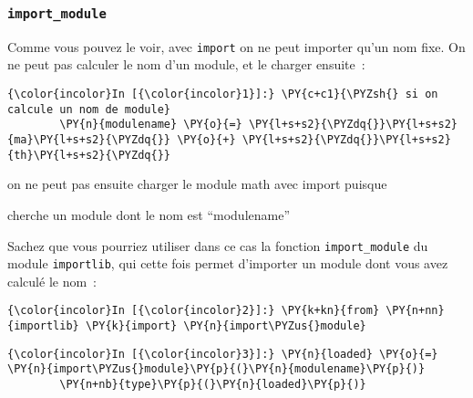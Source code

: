     \hypertarget{import_module}{%
\subsubsection{\texorpdfstring{\texttt{import\_module}}{import\_module}}\label{import_module}}

    Comme vous pouvez le voir, avec \texttt{import} on ne peut importer
qu'un nom fixe. On ne peut pas calculer le nom d'un module, et le
charger ensuite~:

    \begin{Verbatim}[commandchars=\\\{\},frame=single,framerule=0.3mm,rulecolor=\color{cellframecolor}]
{\color{incolor}In [{\color{incolor}1}]:} \PY{c+c1}{\PYZsh{} si on calcule un nom de module}
        \PY{n}{modulename} \PY{o}{=} \PY{l+s+s2}{\PYZdq{}}\PY{l+s+s2}{ma}\PY{l+s+s2}{\PYZdq{}} \PY{o}{+} \PY{l+s+s2}{\PYZdq{}}\PY{l+s+s2}{th}\PY{l+s+s2}{\PYZdq{}}
\end{Verbatim}


    on ne peut pas ensuite charger le module math avec import puisque

\begin{Shaded}
\begin{Highlighting}[frame=lines,framerule=0.6mm,rulecolor=\color{asisframecolor}]
\end{Highlighting}
\end{Shaded}

cherche un module dont le nom est ``modulename''

    Sachez que vous pourriez utiliser dans ce cas la fonction
\texttt{import\_module} du module \texttt{importlib}, qui cette fois
permet d'importer un module dont vous avez calculé le nom~:

    \begin{Verbatim}[commandchars=\\\{\},frame=single,framerule=0.3mm,rulecolor=\color{cellframecolor}]
{\color{incolor}In [{\color{incolor}2}]:} \PY{k+kn}{from} \PY{n+nn}{importlib} \PY{k}{import} \PY{n}{import\PYZus{}module}
\end{Verbatim}


    \begin{Verbatim}[commandchars=\\\{\},frame=single,framerule=0.3mm,rulecolor=\color{cellframecolor}]
{\color{incolor}In [{\color{incolor}3}]:} \PY{n}{loaded} \PY{o}{=} \PY{n}{import\PYZus{}module}\PY{p}{(}\PY{n}{modulename}\PY{p}{)}
        \PY{n+nb}{type}\PY{p}{(}\PY{n}{loaded}\PY{p}{)}
\end{Verbatim}


